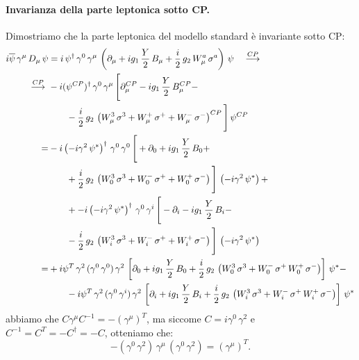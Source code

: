 \paragraph{Invarianza della parte leptonica sotto CP.}Dimostriamo che la parte leptonica del modello standard è invariante sotto CP:
\begin{align}
    i\overline{\psi}\, \gamma^\mu\, D_\mu\, \psi &= i\, \psi^\dagger\, \gamma^0\, \gamma^\mu\, \left( \partial_\mu + ig_1\, \frac{Y}{2}\, B_\mu + \frac{i}{2}\, g_2\, W_\mu^a\, \sigma^a \right)\, \psi \quad \overset{CP}{\longrightarrow}\quad \\
    \overset{CP}{\longrightarrow}\ &-i(\psi^{CP})^\dagger\, \gamma^0\, \gamma^\mu\, \Bigg[ \partial_\mu^{CP} - ig_1\, \frac{Y}{2}\, B_\mu^{CP} - \notag \\
    &\qquad - \frac{i}{2}\, g_2\, \left( W_\mu^3\, \sigma^3 + W_\mu^+\, \sigma^+ + W_\mu^-\, \sigma^- \right)^{CP} \Bigg]\, \psi^{CP} \\
    =& -i\left( -i\gamma^2\, \psi^* \right)^\dagger\, \gamma^0\, \gamma^0\, \Bigg[ +\partial_0 + ig_1\, \frac{Y}{2}\, B_0 + \notag \\
    &\qquad + \frac{i}{2}\, g_2\, \left( W_0^3\, \sigma^3 + W_0^-\, \sigma^+ + W_0^+\, \sigma^- \right) \Bigg]\, \left( -i\gamma^2\, \psi^* \right) + \notag \\
    &\qquad + -i\left( -i\gamma^2\, \psi^* \right)^\dagger\, \gamma^0\, \gamma^i\, \Bigg[ -\partial_i - ig_1\, \frac{Y}{2}\, B_i - \notag \\
    &\qquad - \frac{i}{2}\, g_2\, \left( W_i^3\, \sigma^3 + W_i^-\, \sigma^+ + W_i^+\, \sigma^- \right) \Bigg]\, \left( -i\gamma^2\, \psi^* \right) \\
    =& +i\psi^T\, \gamma^2\, (\gamma^0\, \gamma^0)\, \gamma^2\, \left[ \partial_0 + ig_1\, \frac{Y}{2}\, B_0 + \frac{i}{2}\, g_2\, \left( W_0^3\, \sigma^3 + W_0^-\, \sigma^+\, W_0^+\, \sigma^- \right) \right]\, \psi^* - \notag \\
    &\qquad - i\psi^T\, \gamma^2\, (\gamma^0\, \gamma^i)\, \gamma^2\, \left[ \partial_i + ig_1\, \frac{Y}{2}\, B_i + \frac{i}{2}\, g_2\, \left( W_i^3\, \sigma^3 + W_i^-\, \sigma^+\, W_i^+\, \sigma^- \right) \right]\, \psi^*
\end{align}
abbiamo che $C\gamma^\mu C^{-1} = -(\gamma^\mu)^T$, ma siccome $C=i\gamma^0\, \gamma^2$ e $C^{-1} = C^T = -C^\dagger = -C$, otteniamo che:
\begin{equation}
    -(\gamma^0\, \gamma^2)\, \gamma^\mu\, (\gamma^0\, \gamma^2) = (\gamma^\mu)^T.
\end{equation}
